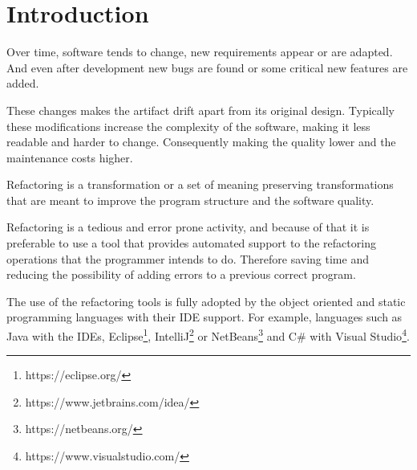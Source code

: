 
% 
% 

\section{Introduction}


Over time, software tends to change, new requirements appear or are adapted. 
And even after development new bugs are found or some critical new features are added.

These changes makes the artifact drift apart from its original design.
Typically these modifications increase the complexity of the software, making it less readable and harder to change. 
Consequently making the quality lower and the maintenance costs higher. %

Refactoring is a transformation or a set of meaning preserving transformations that are meant to improve the program structure and the software quality.\cite{bourquin2007high}



Refactoring is a tedious and error prone activity, and because of that it is preferable to use a tool that provides automated support to the refactoring operations that the programmer intends to do. 
Therefore saving time and reducing the possibility of adding errors to a previous correct program.

The use of the refactoring tools is fully adopted by the object oriented and static programming languages with their IDE support.
For example, languages such as Java with the IDEs, Eclipse\footnote{https://eclipse.org/}, IntelliJ\footnote{https://www.jetbrains.com/idea/} or NetBeans\footnote{https://netbeans.org/} and C\# with Visual Studio\footnote{https://www.visualstudio.com/}.

